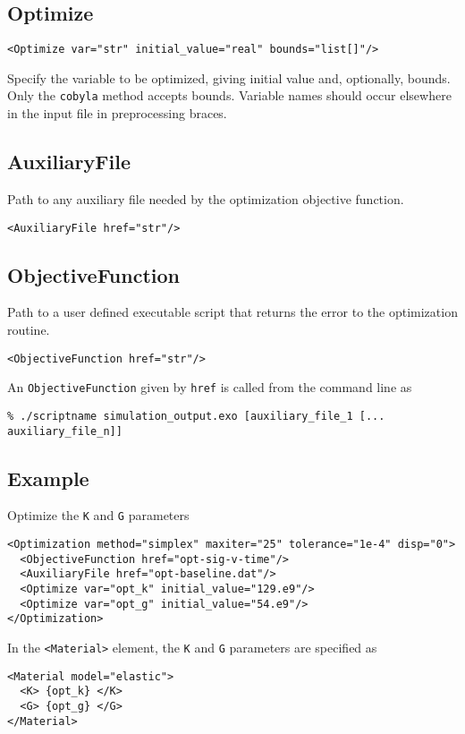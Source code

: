 \documentclass[11pt]{report}
\newcommand{\tag}[1]{\texttt{<#1>}}
\begin{document}
\subsection{Optimize}
\begin{verbatim}
<Optimize var="str" initial_value="real" bounds="list[]"/>
\end{verbatim}
%
Specify the variable to be optimized, giving initial value and, optionally,
bounds.  Only the \texttt{cobyla} method accepts bounds.  Variable names should
occur elsewhere in the input file in preprocessing braces.

\subsection{AuxiliaryFile}
Path to any auxiliary file needed by the optimization objective function.
\begin{verbatim}
<AuxiliaryFile href="str"/>
\end{verbatim}

\subsection{ObjectiveFunction}
Path to a user defined executable script that returns the error to the
optimization routine.
\begin{verbatim}
<ObjectiveFunction href="str"/>
\end{verbatim}

An \texttt{ObjectiveFunction} given by \texttt{href} is called from the
command line as
\begin{verbatim}
% ./scriptname simulation_output.exo [auxiliary_file_1 [... auxiliary_file_n]]
\end{verbatim}

\subsection{Example}
Optimize the \texttt{K} and \texttt{G} parameters
\begin{verbatim}
<Optimization method="simplex" maxiter="25" tolerance="1e-4" disp="0">
  <ObjectiveFunction href="opt-sig-v-time"/>
  <AuxiliaryFile href="opt-baseline.dat"/>
  <Optimize var="opt_k" initial_value="129.e9"/>
  <Optimize var="opt_g" initial_value="54.e9"/>
</Optimization>
\end{verbatim}

In the \tag{Material} element, the \texttt{K} and \texttt{G} parameters are
specified as
%
\begin{verbatim}
<Material model="elastic">
  <K> {opt_k} </K>
  <G> {opt_g} </G>
</Material>
\end{verbatim}
\end{document}
